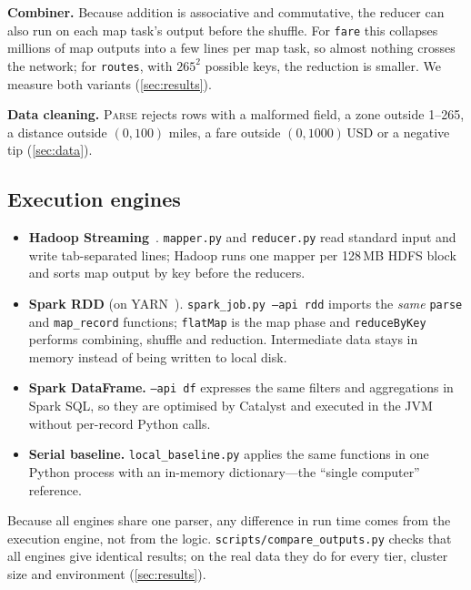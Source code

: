 \textbf{Combiner.} Because addition is associative and commutative, the reducer can
also run on each map task's output before the shuffle. For \texttt{fare} this
collapses millions of map outputs into a few lines per map task, so almost nothing
crosses the network; for \texttt{routes}, with $265^2$ possible keys, the reduction is
smaller. We measure both variants (\cref{sec:results}).

\textbf{Data cleaning.} \textsc{Parse} rejects rows with a malformed field, a zone
outside 1--265, a distance outside $(0,100)$ miles, a fare outside $(0,1000)$\,USD or a
negative tip (\cref{sec:data}).

\subsection{Execution engines}
\begin{itemize}
  \item \textbf{Hadoop Streaming}~\cite{hadoop_streaming,noll_streaming}.
        \texttt{mapper.py} and \texttt{reducer.py} read standard input and write
        tab-separated lines; Hadoop runs one mapper per
        128\,MB HDFS block and sorts map output by key before the reducers.
  \item \textbf{Spark RDD} (on YARN~\cite{spark_yarn}). \texttt{spark\_job.py --api rdd} imports the \emph{same}
        \texttt{parse} and \texttt{map\_record} functions; \texttt{flatMap} is the map
        phase and \texttt{reduceByKey} performs combining, shuffle and reduction.
        Intermediate data stays in memory instead of being written to local disk.
  \item \textbf{Spark DataFrame.} \texttt{--api df} expresses the same filters and
        aggregations in Spark SQL, so they are optimised by Catalyst and executed in
        the JVM without per-record Python calls.
  \item \textbf{Serial baseline.} \texttt{local\_baseline.py} applies the same
        functions in one Python process with an in-memory dictionary---the
        ``single computer'' reference.
\end{itemize}
Because all engines share one parser, any difference in run time comes from the
execution engine, not from the logic. \texttt{scripts/compare\_outputs.py} checks that
all engines give identical results; on the real data they do for every tier,
cluster size and environment (\cref{sec:results}).

